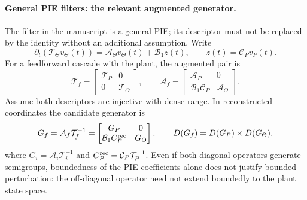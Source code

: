 \documentclass[11pt,a4paper]{article}
\begin{document}
\paragraph{General PIE filters: the relevant augmented generator.}
The filter in the manuscript is a general PIE; its descriptor must not
be replaced by the identity without an additional assumption. Write
\[
 \partial_t(\mathcal T_\Theta v_\Theta(t))
 =\mathcal A_\Theta v_\Theta(t)+\mathcal B_1 z(t),
 \qquad z(t)=\mathcal C_Pv_P(t).
\]
For a feedforward cascade with the plant, the augmented pair is
\begin{equation}\label{eq:general-cascade-pair}
 \mathcal T_f=\begin{bmatrix}\mathcal T_P&0\\0&\mathcal T_\Theta\end{bmatrix},
 \qquad
 \mathcal A_f=\begin{bmatrix}
  \mathcal A_P&0\\\mathcal B_1\mathcal C_P&\mathcal A_\Theta
 \end{bmatrix}.
\end{equation}
Assume both descriptors are injective with dense range. In reconstructed
coordinates the candidate generator is
\[
 G_f=\mathcal A_f\mathcal T_f^{-1}
 =\begin{bmatrix}
  G_P&0\\\mathcal B_1 C_P^{\rm rec}&G_\Theta
 \end{bmatrix},\qquad
 D(G_f)=D(G_P)\times D(G_\Theta),
\]
where $G_i=\mathcal A_i\mathcal T_i^{-1}$ and
$C_P^{\rm rec}=\mathcal C_P\mathcal T_P^{-1}$.
Even if both diagonal operators generate semigroups, boundedness of the
PIE coefficients alone does not justify bounded perturbation: the
off-diagonal operator need not extend boundedly to the plant state space.
\end{document}
